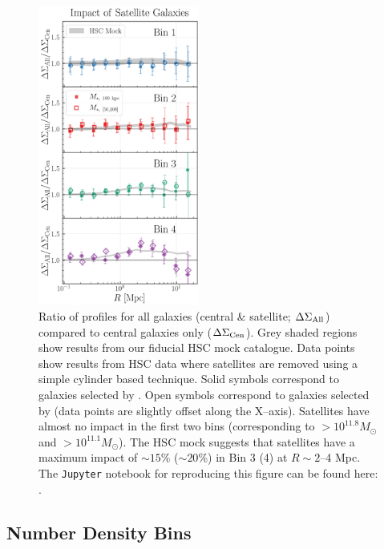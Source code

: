 \documentclass[fleqn,usenatbib,useAMS]{mnras}
\begin{document}
\begin{CJK*}{UTF8}{gbsn}
\begin{figure}
    \centering
    \includegraphics[width=0.47\textwidth]{figure/fig_4}
    \caption{
        Ratio of \dsigma{} profiles for all galaxies (central \& satellite; $\Delta\Sigma_{\rm
        All}$) compared to central galaxies only ($\Delta\Sigma_{\rm Cen}$).
        Grey shaded regions show results from our fiducial HSC mock catalogue.
        Data points show results from HSC data where satellites are removed using a simple cylinder
        based technique. 
        Solid symbols correspond to galaxies selected by . 
        Open symbols correspond to galaxies selected by  (data points are slightly
        offset along the X--axis).
        Satellites have almost no impact in the first two bins (corresponding to $>
        10^{11.8} M_{\odot}$ and $> 10^{11.1} M_{\odot}$). 
        The HSC mock suggests that satellites have a maximum impact of $\sim 15$\% ($\sim 20$\%) in
        Bin 3 (4) at $R\sim 2$--4 Mpc.
        The \texttt{Jupyter} notebook for reproducing this figure can be found here:
        \href{https://github.com/dr-guangtou/jianbing/blob/master/notebooks/figure/fig4.ipynb}{\faGithub}.
    }
    \label{fig:satellite}
\end{figure}

\subsection{Number Density Bins}
    \label{sec:binning}


\end{CJK*}
\end{document}

